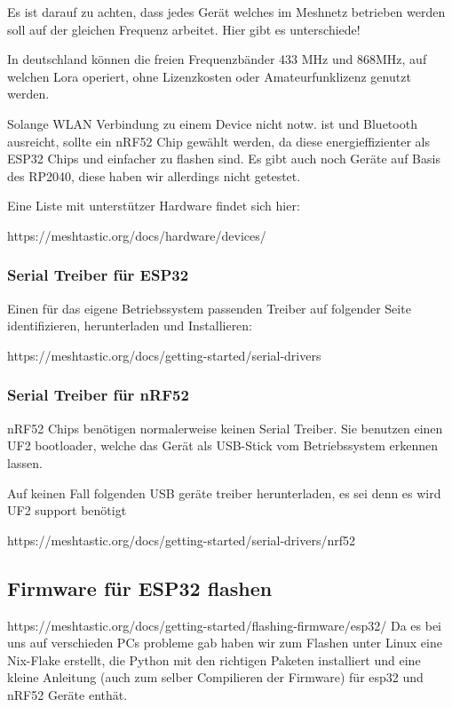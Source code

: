 \documentclass[12pt,a4paper]{article}
\begin{document}
Es ist darauf zu achten, dass jedes Gerät welches im Meshnetz betrieben werden soll auf der gleichen Frequenz arbeitet. Hier gibt es unterschiede!

In deutschland können die freien Frequenzbänder 433 MHz und 868MHz, auf welchen Lora operiert, ohne Lizenzkosten oder Amateurfunklizenz genutzt werden.

Solange WLAN Verbindung zu einem Device nicht notw. ist und Bluetooth ausreicht, sollte ein nRF52 Chip gewählt werden, da diese energieffizienter als ESP32 Chips und einfacher zu flashen sind. Es gibt auch noch Geräte auf Basis des RP2040, diese haben wir allerdings nicht getestet.

Eine Liste mit unterstützer Hardware findet sich hier:

https://meshtastic.org/docs/hardware/devices/

\subsubsection{Serial Treiber für ESP32}
Einen für das eigene Betriebssystem passenden Treiber auf folgender Seite identifizieren, herunterladen und Installieren:

https://meshtastic.org/docs/getting-started/serial-drivers

\subsubsection{Serial Treiber für nRF52}
nRF52 Chips benötigen normalerweise keinen Serial Treiber. Sie benutzen einen UF2 bootloader, welche das Gerät als USB-Stick vom Betriebssystem erkennen lassen.

Auf keinen Fall folgenden USB geräte treiber herunterladen, es sei denn es wird UF2 support benötigt

https://meshtastic.org/docs/getting-started/serial-drivers/nrf52

\subsection{Firmware für ESP32 flashen}
https://meshtastic.org/docs/getting-started/flashing-firmware/esp32/ Da es bei uns auf verschieden PCs probleme gab haben wir zum Flashen unter Linux eine Nix-Flake erstellt, die Python mit den richtigen Paketen installiert und eine kleine Anleitung (auch zum selber Compilieren der Firmware) für esp32 und nRF52 Geräte enthät.
\end{document}
